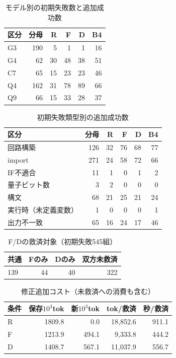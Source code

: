 \begin{table}[tb]
\centering
\caption{モデル別の初期失敗数と追加成功数}
\label{tab:model}
\begin{tabular}{lrrrrr}
\hline
区分 & 分母 & R & F & D & B4 \\
\hline
G3 & 190 & 5 & 1 & 1 & 16 \\
G4 & 62 & 30 & 48 & 38 & 51 \\
C7 & 65 & 15 & 23 & 23 & 46 \\
Q4 & 162 & 31 & 78 & 89 & 66 \\
Q9 & 66 & 15 & 33 & 28 & 37 \\
\hline
\end{tabular}
\end{table}

\begin{table}[tb]
\centering
\caption{初期失敗類型別の追加成功数}
\label{tab:error}
\begin{tabular}{lrrrrr}
\hline
区分 & 分母 & R & F & D & B4 \\
\hline
回路構築 & 126 & 32 & 76 & 68 & 77 \\
import & 271 & 24 & 58 & 72 & 66 \\
IF不適合 & 11 & 1 & 0 & 1 & 2 \\
量子ビット数 & 3 & 2 & 0 & 0 & 0 \\
構文 & 68 & 21 & 25 & 21 & 24 \\
実行時（未定義変数） & 1 & 0 & 0 & 0 & 1 \\
出力不一致 & 65 & 16 & 24 & 17 & 46 \\
\hline
\end{tabular}
\end{table}

\begin{table}[tb]
\centering
\caption{F/Dの救済対象（初期失敗545組）}
\label{tab:overlap}
\begin{tabular}{lrrr}
\hline
共通 & Fのみ & Dのみ & 双方未救済 \\
\hline
139 & 44 & 40 & 322 \\
\hline
\end{tabular}
\end{table}

\begin{table}[tb]
\centering
\caption{修正追加コスト（未救済への消費も含む）}
\label{tab:cost}
\begin{tabular}{lrrrr}
\hline
条件 & 保存$10^3$tok & 新$10^3$tok & tok/救済 & 秒/救済 \\
\hline
R & 1809.8 & 0.0 & 18,852.6 & 911.1 \\
F & 1213.9 & 494.1 & 9,333.8 & 444.2 \\
D & 1408.7 & 567.1 & 11,037.9 & 556.7 \\
\hline
\end{tabular}
\end{table}

